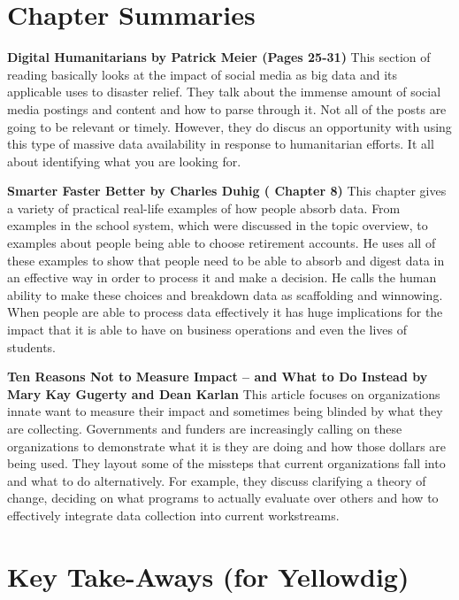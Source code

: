 \documentclass[]{book}
\theoremstyle{definition}
\theoremstyle{definition}
\theoremstyle{definition}
\theoremstyle{remark}
\begin{document}
\hypertarget{chapter-summaries-1}{%
\section{Chapter Summaries}\label{chapter-summaries-1}}

\textbf{Digital Humanitarians by Patrick Meier (Pages 25-31)} This
section of reading basically looks at the impact of social media as big
data and its applicable uses to disaster relief. They talk about the
immense amount of social media postings and content and how to parse
through it. Not all of the posts are going to be relevant or timely.
However, they do discus an opportunity with using this type of massive
data availability in response to humanitarian efforts. It all about
identifying what you are looking for.

\textbf{Smarter Faster Better by Charles Duhig ( Chapter 8)} This
chapter gives a variety of practical real-life examples of how people
absorb data. From examples in the school system, which were discussed in
the topic overview, to examples about people being able to choose
retirement accounts. He uses all of these examples to show that people
need to be able to absorb and digest data in an effective way in order
to process it and make a decision. He calls the human ability to make
these choices and breakdown data as scaffolding and winnowing. When
people are able to process data effectively it has huge implications for
the impact that it is able to have on business operations and even the
lives of students.

\textbf{Ten Reasons Not to Measure Impact -- and What to Do Instead by
Mary Kay Gugerty and Dean Karlan} This article focuses on organizations
innate want to measure their impact and sometimes being blinded by what
they are collecting. Governments and funders are increasingly calling on
these organizations to demonstrate what it is they are doing and how
those dollars are being used. They layout some of the missteps that
current organizations fall into and what to do alternatively. For
example, they discuss clarifying a theory of change, deciding on what
programs to actually evaluate over others and how to effectively
integrate data collection into current workstreams.

\hypertarget{key-take-aways-for-yellowdig-1}{%
\section{Key Take-Aways (for
Yellowdig)}\label{key-take-aways-for-yellowdig-1}}
\end{document}
